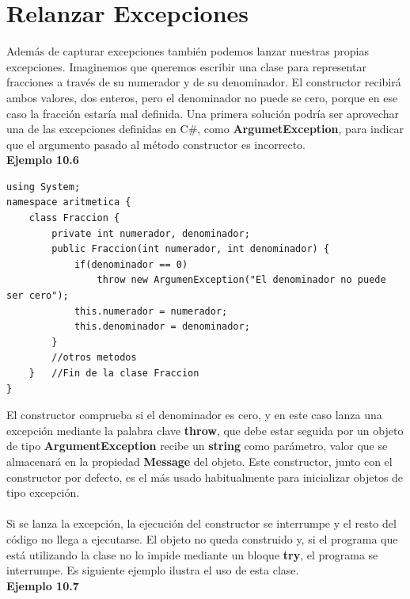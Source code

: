 \documentclass[12pt,a4paper]{report}
\begin{document}
\section{Relanzar Excepciones}
Además de capturar excepciones también podemos lanzar nuestras propias excepciones. Imaginemos que queremos escribir una clase para representar fracciones a través de su numerador y de su denominador. El constructor recibirá ambos valores, dos enteros, pero el denominador no puede se cero, porque en ese caso la fracción estaría mal definida. Una primera solución podría ser aprovechar una de las excepciones definidas en C\#, como \textbf{ArgumetException}, para indicar que el argumento pasado al método constructor es incorrecto.\\\textbf{Ejemplo 10.6}
\begin{lstlisting}
using System;
namespace aritmetica {
	class Fraccion {
		private int numerador, denominador;
		public Fraccion(int numerador, int denominador) {
			if(denominador == 0)
				throw new ArgumenException("El denominador no puede ser cero");		
			this.numerador = numerador;
			this.denominador = denominador;		
		}
		//otros metodos	
	}	//Fin de la clase Fraccion
}
\end{lstlisting}El constructor comprueba si el denominador es cero, y en este caso lanza una excepción mediante la palabra clave \textbf{throw}, que debe estar seguida por un objeto de tipo \textbf{ArgumentException} recibe un \textbf{string} como parámetro, valor que se almacenará en la propiedad \textbf{Message} del objeto. Este constructor, junto con el constructor por defecto, es el más usado habitualmente para inicializar objetos de tipo excepción.\\\\Si se lanza la excepción, la ejecución del constructor se interrumpe y el resto del código no llega a ejecutarse. El objeto no queda construido y, si el programa que está utilizando la clase no lo impide mediante un bloque \textbf{try}, el programa se interrumpe. Es siguiente ejemplo ilustra el uso de esta clase.\\\textbf{Ejemplo 10.7}
\end{document}
